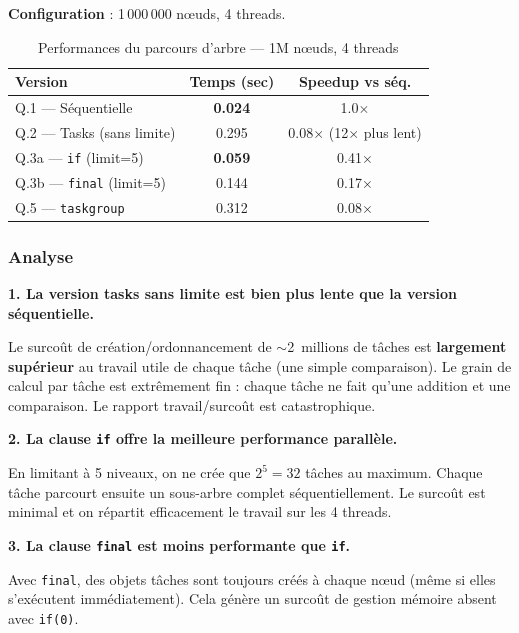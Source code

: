 \documentclass[12pt,a4paper]{article}
\begin{document}
\textbf{Configuration} : 1\,000\,000 n\oe uds, 4 threads.

\begin{table}[h!]
\centering
\begin{tabular}{lcc}
\toprule
\textbf{Version} & \textbf{Temps (sec)} & \textbf{Speedup vs séq.} \\
\midrule
Q.1 --- Séquentielle          & \textbf{0.024} & 1.0$\times$              \\
Q.2 --- Tasks (sans limite)   & 0.295          & 0.08$\times$ (12$\times$ plus lent) \\
Q.3a --- \texttt{if} (limit=5)    & \textbf{0.059} & 0.41$\times$             \\
Q.3b --- \texttt{final} (limit=5) & 0.144          & 0.17$\times$             \\
Q.5 --- \texttt{taskgroup}        & 0.312          & 0.08$\times$             \\
\bottomrule
\end{tabular}
\caption{Performances du parcours d'arbre --- 1M n\oe uds, 4 threads}
\end{table}

\subsubsection{Analyse}

\textbf{1. La version tasks sans limite est bien plus lente que la version
séquentielle.}

Le surcoût de création/ordonnancement de $\sim$2~millions de tâches est
\textbf{largement supérieur} au travail utile de chaque tâche (une simple
comparaison). Le grain de calcul par tâche est extrêmement fin : chaque tâche ne
fait qu'une addition et une comparaison. Le rapport travail/surcoût est
catastrophique.

\textbf{2. La clause \texttt{if} offre la meilleure performance parallèle.}

En limitant à 5 niveaux, on ne crée que $2^5 = 32$ tâches au maximum. Chaque
tâche parcourt ensuite un sous-arbre complet séquentiellement. Le surcoût est
minimal et on répartit efficacement le travail sur les 4 threads.

\textbf{3. La clause \texttt{final} est moins performante que \texttt{if}.}

Avec \texttt{final}, des objets tâches sont toujours créés à chaque n\oe ud
(même si elles s'exécutent immédiatement). Cela génère un surcoût de gestion
mémoire absent avec \texttt{if(0)}.
\end{document}
